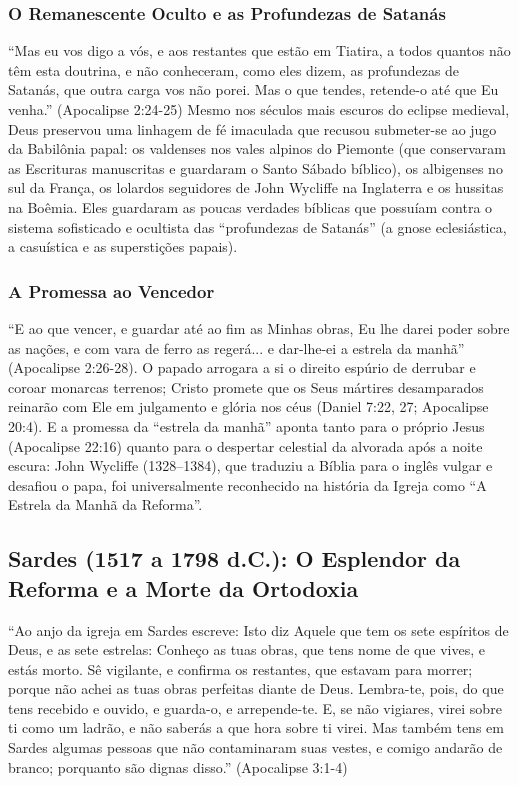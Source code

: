 \documentclass[11pt,a4paper,openany]{book}
\begin{document}
\subsubsection*{O Remanescente Oculto e as Profundezas de Satanás}
``Mas eu vos digo a vós, e aos restantes que estão em Tiatira, a todos quantos não têm esta doutrina, e não conheceram, como eles dizem, as profundezas de Satanás, que outra carga vos não porei. Mas o que tendes, retende-o até que Eu venha.'' (Apocalipse 2:24-25)
Mesmo nos séculos mais escuros do eclipse medieval, Deus preservou uma linhagem de fé imaculada que recusou submeter-se ao jugo da Babilônia papal: os valdenses nos vales alpinos do Piemonte (que conservaram as Escrituras manuscritas e guardaram o Santo Sábado bíblico), os albigenses no sul da França, os lolardos seguidores de John Wycliffe na Inglaterra e os hussitas na Boêmia. Eles guardaram as poucas verdades bíblicas que possuíam contra o sistema sofisticado e ocultista das ``profundezas de Satanás'' (a gnose eclesiástica, a casuística e as superstições papais).


\subsubsection*{A Promessa ao Vencedor}
``E ao que vencer, e guardar até ao fim as Minhas obras, Eu lhe darei poder sobre as nações, e com vara de ferro as regerá... e dar-lhe-ei a estrela da manhã'' (Apocalipse 2:26-28). O papado arrogara a si o direito espúrio de derrubar e coroar monarcas terrenos; Cristo promete que os Seus mártires desamparados reinarão com Ele em julgamento e glória nos céus (Daniel 7:22, 27; Apocalipse 20:4). E a promessa da ``estrela da manhã'' aponta tanto para o próprio Jesus (Apocalipse 22:16) quanto para o despertar celestial da alvorada após a noite escura: John Wycliffe (1328–1384), que traduziu a Bíblia para o inglês vulgar e desafiou o papa, foi universalmente reconhecido na história da Igreja como ``A Estrela da Manhã da Reforma''.



\subsection{Sardes (1517 a 1798 d.C.): O Esplendor da Reforma e a Morte da Ortodoxia}


``Ao anjo da igreja em Sardes escreve: Isto diz Aquele que tem os sete espíritos de Deus, e as sete estrelas: Conheço as tuas obras, que tens nome de que vives, e estás morto. Sê vigilante, e confirma os restantes, que estavam para morrer; porque não achei as tuas obras perfeitas diante de Deus. Lembra-te, pois, do que tens recebido e ouvido, e guarda-o, e arrepende-te. E, se não vigiares, virei sobre ti como um ladrão, e não saberás a que hora sobre ti virei. Mas também tens em Sardes algumas pessoas que não contaminaram suas vestes, e comigo andarão de branco; porquanto são dignas disso.'' (Apocalipse 3:1-4)
\end{document}
